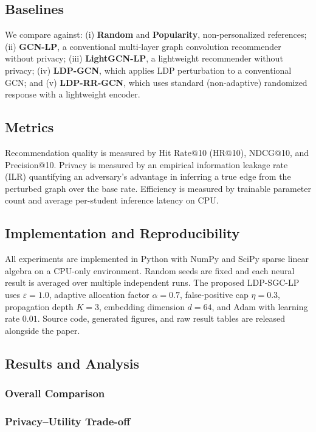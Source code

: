 \documentclass[sn-mathphys]{sn-jnl}
\begin{document}
\subsection{Baselines}
We compare against: (i) \textbf{Random} and \textbf{Popularity}, non-personalized references; (ii) \textbf{GCN-LP}, a conventional multi-layer graph convolution recommender without privacy; (iii) \textbf{LightGCN-LP}, a lightweight recommender without privacy; (iv) \textbf{LDP-GCN}, which applies LDP perturbation to a conventional GCN; and (v) \textbf{LDP-RR-GCN}, which uses standard (non-adaptive) randomized response with a lightweight encoder.

\subsection{Metrics}
Recommendation quality is measured by Hit Rate@10 (HR@10), NDCG@10, and Precision@10. Privacy is measured by an empirical information leakage rate (ILR) quantifying an adversary's advantage in inferring a true edge from the perturbed graph over the base rate. Efficiency is measured by trainable parameter count and average per-student inference latency on CPU.

\subsection{Implementation and Reproducibility}
All experiments are implemented in Python with NumPy and SciPy sparse linear algebra on a CPU-only environment. Random seeds are fixed and each neural result is averaged over multiple independent runs. The proposed LDP-SGC-LP uses $\varepsilon=1.0$, adaptive allocation factor $\alpha=0.7$, false-positive cap $\eta=0.3$, propagation depth $K=3$, embedding dimension $d=64$, and Adam with learning rate $0.01$. Source code, generated figures, and raw result tables are released alongside the paper.

\subsection{Results and Analysis}
\subsubsection{Overall Comparison}

\subsubsection{Privacy--Utility Trade-off}
\end{document}
